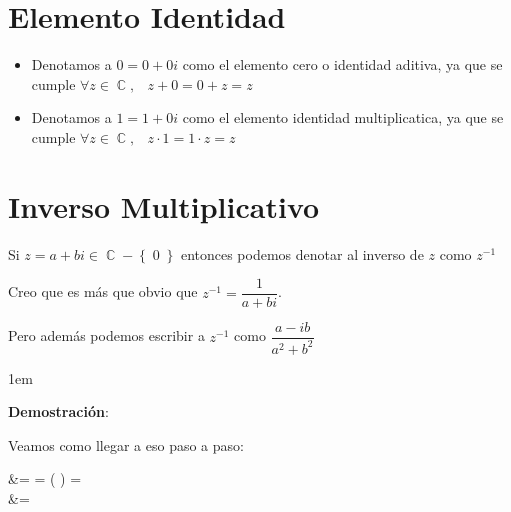 \documentclass[12pt, fleqn]{report}                             %
\newenvironment{SmallIndentation}[1][0.75em]                    %
        {\begin{adjustwidth}{#1}{}\begin{footnotesize}}             %
        {\end{footnotesize}\end{adjustwidth}}                       %
\def \Eq {equation}                                             %
\newenvironment{MultiLineEquation*}[1]                          %
        {\begin{\Eq*}\begin{alignedat}{#1}}                         %
        {\end{alignedat}\end{\Eq*}}                                 %
\DeclareMathOperator \Space     {\quad}                         %
\DeclareMathOperator \MiniSpace {\;}                            %
\theoremstyle{break}                                            %
\DeclareMathOperator \Complexs     {\mathbb{C}}                 %
\newcommand{\Set}[1]            {\left\{ \; #1 \; \right\}}     %
\newcommand{\Wrap}[1]           {\left( #1 \right)}             %
\newcommand{\pfrac}[2]      {\Wrap{\dfrac{#1}{#2}}}             %
\begin{document}
        \clearpage
        \section{Elemento Identidad}

            \begin{itemize}
                \item Denotamos a $0 = 0 + 0i$ como el elemento cero o identidad aditiva, ya que se cumple 
                        $\forall z \in \Complexs, \MiniSpace z + 0 = 0 + z = z$

                \item Denotamos a $1 = 1 + 0i$ como el elemento identidad multiplicatica, ya que se cumple 
                        $\forall z \in \Complexs, \MiniSpace z \cdot 1 = 1 \cdot z = z$
            \end{itemize}



        \section{Inverso Multiplicativo}
            
            Si $z = a + bi \in \Complexs - \Set{0}$ entonces podemos denotar al inverso de $z$ como
            $z^{-1}$

            Creo que es más que obvio que $z^{-1} = \dfrac{1}{a+bi}$.

            Pero además podemos escribir a $z^{-1}$ como $\dfrac{a-ib}{a^2+b^2}$

            \begin{SmallIndentation}[1em]
                \textbf{Demostración}:
                
                Veamos como llegar a eso paso a paso:
                \begin{MultiLineEquation*}{1}
                     &=                          
                                  = \pfrac{a-bi}{a-bi}
                                  =               \\
                                 &=                  
                \end{MultiLineEquation*}

            \end{SmallIndentation}
\end{document}

